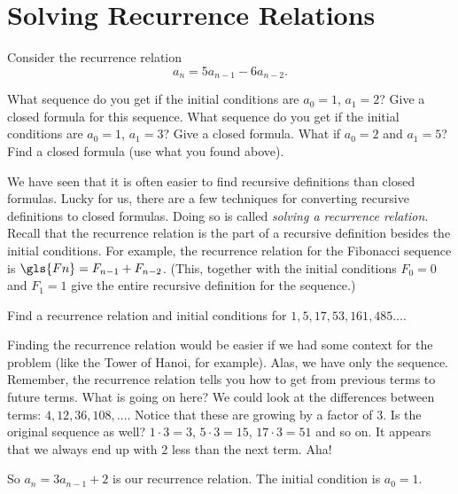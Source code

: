 \documentclass[12pt]{article}
\begin{document}
\section{Solving Recurrence Relations}

\begin{activity}
Consider the recurrence relation 
\[a_n = 5a_{n-1} - 6a_{n-2}.\]

\begin{questions}
\question What sequence do you get if the initial conditions are $a_0 = 1$, $a_1 = 2$?  Give a closed formula for this sequence.
\question What sequence do you get if the initial conditions are $a_0 = 1$, $a_1 = 3$?  Give a closed formula.
\question What if $a_0 = 2$ and $a_1 = 5$?  Find a closed formula (use what you found above).
\end{questions}
\end{activity}

We have seen that it is often easier to find recursive definitions than closed formulas.  Lucky for us, there are a few techniques for converting recursive definitions to closed formulas.  Doing so is called \emph{solving a recurrence relation}.  Recall that the recurrence relation is the part of a recursive definition besides the initial conditions.  For example, the recurrence relation for the Fibonacci sequence is $\gls{Fn} = F_{n-1} + F_{n-2}$.  (This, together with the initial conditions $F_0 = 0$ and $F_1 = 1$ give the entire recursive definition for the sequence.)  
 
\begin{example}
  Find a recurrence relation and initial conditions for $1, 5, 17, 53, 161, 485\ldots$. 
  \begin{solution}
    Finding the recurrence relation would be easier if we had some context for the problem (like the Tower of Hanoi, for example).  Alas, we have only the sequence.  Remember, the recurrence relation tells you how to get from previous terms to future terms.  What is going on here?  We could look at the differences between terms: $4, 12, 36, 108, \ldots$.  Notice that these are growing by a factor of 3.  Is the original sequence as well?  $1\cdot 3 = 3$, $5 \cdot 3 = 15$, $17 \cdot 3 = 51$ and so on.  It appears that we always end up with 2 less than the next term.  Aha!  
    
    So $a_n = 3a_{n-1} + 2$ is our recurrence relation.  The initial condition is $a_0 = 1$.
  \end{solution}

\end{example}
\end{document}
